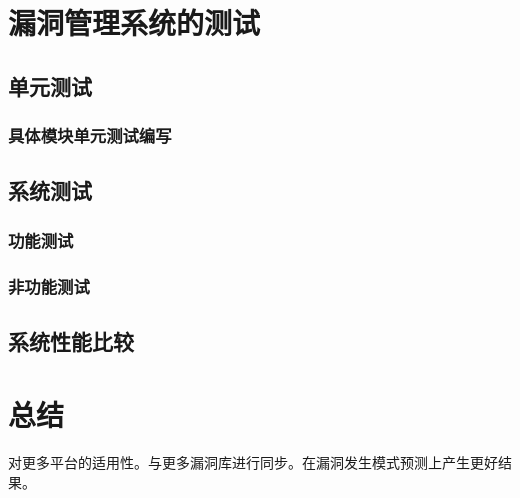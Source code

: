 \documentclass[a4paper]{ctexrep}
\begin{document}
	\chapter{漏洞管理系统的测试}
		\section{单元测试}
			\subsection{具体模块单元测试编写}
		\section{系统测试}
			\subsection{功能测试}
			\subsection{非功能测试}
		\section{系统性能比较}
	\chapter{总结}
	对更多平台的适用性。与更多漏洞库进行同步。在漏洞发生模式预测上产生更好结果。
	
	
	
\end{document}
